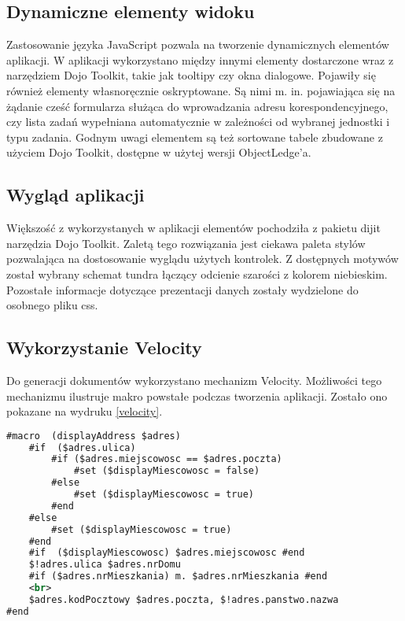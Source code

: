 \subsection[Dynamiczne elementy widoku][Dynamiczne elementy widoku]{Dynamiczne elementy widoku}
Zastosowanie języka JavaScript pozwala na tworzenie dynamicznych elementów aplikacji. W aplikacji wykorzystano między innymi elementy dostarczone wraz z narzędziem Dojo Toolkit, takie jak tooltipy czy okna dialogowe. Pojawiły się również elementy własnoręcznie oskryptowane. Są nimi m. in. pojawiająca się na żądanie cześć formularza służąca do wprowadzania adresu korespondencyjnego, czy lista zadań wypełniana automatycznie w zależności od wybranej jednostki i typu zadania. Godnym uwagi elementem są też sortowane tabele zbudowane z użyciem Dojo Toolkit, dostępne w użytej wersji ObjectLedge'a.

\subsection[Wygląd aplikacji][Wygląd aplikacji]{Wygląd aplikacji}
Większość z wykorzystanych w aplikacji elementów pochodziła z pakietu dijit narzędzia Dojo Toolkit. Zaletą tego rozwiązania jest ciekawa paleta stylów pozwalająca na dostosowanie wyglądu użytych kontrolek. Z dostępnych motywów został wybrany schemat tundra łączący odcienie szarości z kolorem niebieskim. Pozostałe informacje dotyczące prezentacji danych zostały wydzielone do osobnego pliku css.

\subsection[Wykorzystanie Velocity][Wykorzystanie Velocity]{Wykorzystanie Velocity}
Do generacji dokumentów wykorzystano mechanizm Velocity. Możliwości tego mechanizmu ilustruje makro powstałe podczas tworzenia aplikacji. Zostało ono pokazane na wydruku \ref{velocity}.

\begin{lstlisting}[language=XML,style=outcode,showstringspaces=false,caption=Definicja makra w Velocity,label={velocity}]
#macro  (displayAddress $adres) 
	#if  ($adres.ulica)
		#if ($adres.miejscowosc == $adres.poczta)
			#set ($displayMiescowosc = false)
		#else
			#set ($displayMiescowosc = true)
		#end
	#else
		#set ($displayMiescowosc = true)
	#end
	#if  ($displayMiescowosc) $adres.miejscowosc #end
	$!adres.ulica $adres.nrDomu 
	#if ($adres.nrMieszkania) m. $adres.nrMieszkania #end
	<br>
	$adres.kodPocztowy $adres.poczta, $!adres.panstwo.nazwa
#end
\end{lstlisting}

